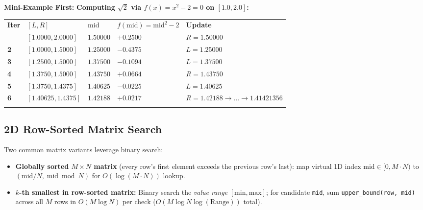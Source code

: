 \documentclass[11pt,a4paper]{article}
\theoremstyle{definition}
\newcommand{\examplebeat}{\textbf{\color{primaryblue}Mini-Example First:} }
\begin{document}
\examplebeat \textbf{Computing $\sqrt{2}$ via $f(x) = x^2 - 2 = 0$ on $[1.0, 2.0]$:}
\begin{center}
\begingroup\footnotesize{}
\begin{tabularx}{\textwidth}{>{\centering\arraybackslash\bfseries}p{1.1cm} >{\centering\arraybackslash}p{2.6cm} >{\centering\arraybackslash}p{2.0cm} >{\centering\arraybackslash}p{2.4cm} >{\raggedright\arraybackslash}X}
\arrayrulecolor{primaryblue}\toprule[1.1pt]
\rowcolor{primaryblue!10}
\textcolor{primaryblue}{\textbf{Iter}} & \textcolor{primaryblue}{\textbf{$[L, R]$}} & \textcolor{primaryblue}{\textbf{$\text{mid}$}} & \textcolor{primaryblue}{\textbf{$f(\text{mid}) = \text{mid}^2 - 2$}} & \textcolor{primaryblue}{\textbf{Update}} \\
\arrayrulecolor{codeframe}\midrule[0.6pt]
1 & $[1.0000, 2.0000]$ & $1.50000$ & $+0.2500$ & $R = 1.50000$ \\
2 & $[1.0000, 1.5000]$ & $1.25000$ & $-0.4375$ & $L = 1.25000$ \\
3 & $[1.2500, 1.5000]$ & $1.37500$ & $-0.1094$ & $L = 1.37500$ \\
4 & $[1.3750, 1.5000]$ & $1.43750$ & $+0.0664$ & $R = 1.43750$ \\
5 & $[1.3750, 1.4375]$ & $1.40625$ & $-0.0225$ & $L = 1.40625$ \\
6 & $[1.40625, 1.4375]$ & $1.42188$ & $+0.0217$ & $R = 1.42188 \to \dots \to \mathbf{1.41421356}$ \\
\arrayrulecolor{primaryblue}\bottomrule[1.1pt]
\end{tabularx}\endgroup
\end{center}

\subsection{2D Row-Sorted Matrix Search}

Two common matrix variants leverage binary search:
\begin{itemize}
    \item \textbf{Globally sorted $M \times N$ matrix} (every row's first element exceeds the previous row's last): map virtual 1D index $\text{mid} \in [0, M \cdot N)$ to $(\text{mid} / N,\; \text{mid} \bmod N)$ for $O(\log(M \cdot N))$ lookup.
    \item \textbf{$k$-th smallest in row-sorted matrix:} Binary search the \emph{value range} $[\text{min}, \text{max}]$; for candidate \texttt{mid}, sum \texttt{upper\_bound(row, mid)} across all $M$ rows in $O(M \log N)$ per check ($O(M \log N \log(\text{Range}))$ total).
\end{itemize}
\end{document}
